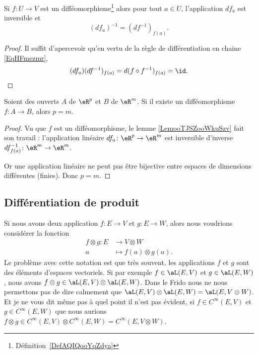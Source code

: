 \begin{lemma}       \label{LemooTJSZooWkuSzv}
    Si \( f\colon U\to V\) est un difféomorphisme\footnote{Définition~\ref{DefAQIQooYqZdya}} alors pour tout \( a\in U\), l'application \( df_a\) est inversible et
    \begin{equation}
        (df_a)^{-1}=(df^{-1})_{f(a)}.
    \end{equation}
\end{lemma}

\begin{proof}
    Il suffit d'apercevoir qu'en vertu de la règle de différentiation en chaine \eqref{EqHFmezmr},
    \begin{equation}
        (df_a)(df^{-1})_{f(a)}=d(f\circ f^{-1})_{f(a)}=\id.
    \end{equation}
\end{proof}

\begin{proposition}     \label{PROPooNONAooCyAtce}
    Soient des ouverts \( A\) de \( \eR^p\) et \( B\) de \( \eR^m\). Si il existe un difféomorphisme \( f\colon A\to B\), alors \( p=m\).
\end{proposition}

\begin{proof}
    Vu que \( f\) est un difféomorphisme, le lemme \ref{LemooTJSZooWkuSzv} fait son travail : l'application linéaire \( df_a\colon \eR^p\to \eR^m\) est inversible d'inverse \( df^{-1}_{f(a)}\colon \eR^m\to \eR^m\).

    Or une application linéaire ne peut pas être bijective entre espaces de dimensions différentes (finies). Donc \( p=m\).
\end{proof}

\subsection{Différentiation de produit}

Si nous avons deux application \( f\colon E\to V\) et \( g\colon E\to W\), alors nous voudrions considérer la fonction
\begin{equation}
    \begin{aligned}
        f\otimes g\colon E&\to V\otimes W \\
        a&\mapsto f(a)\otimes g(a). 
    \end{aligned}
\end{equation}
Le problème avec cette notation est que très souvent, les applications \( f\) et \( g\) sont des éléments d'espaces vectoriels. Si par exemple \( f\in \aL(E,V)\) et \( g\in \aL(E,W)\), nous avons \( f\otimes g\in \aL(E,V)\otimes \aL(E,W)\). Dans le Frido nous ne nous permettons pas de dire calmement que \( \aL(E,V)\otimes \aL(E,W)=\aL(E,V\otimes W)\). Et je ne vous dit même pas à quel point il n'est pas évident, si \( f\in C^{\infty}(E,V)\) et \( g\in  C^{\infty}(E,W)\) que nous aurions \( f\otimes g\in C^{\infty}(E,V)\otimes  C^{\infty}(E,W)= C^{\infty}(E,V\otimes W)\).


